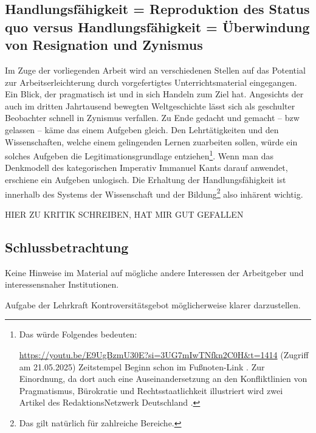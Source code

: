 \subsection{Handlungsfähigkeit = Reproduktion des Status quo versus Handlungsfähigkeit = Überwindung von Resignation und Zynismus}
Im Zuge der vorliegenden Arbeit wird an verschiedenen Stellen auf das Potential zur Arbeitserleichterung durch vorgefertigtes Unterrichtsmaterial eingegangen. Ein Blick, der pragmatisch ist und in sich Handeln zum Ziel hat. Angesichts der auch im dritten Jahrtausend bewegten Weltgeschichte lässt sich als geschulter Beobachter schnell in Zynismus verfallen. Zu Ende gedacht und gemacht -- \gls{bzw} gelassen -- käme das einem Aufgeben gleich. Den Lehrtätigkeiten und den Wissenschaften, welche einem gelingenden Lernen zuarbeiten sollen, würde ein solches Aufgeben die Legitimationsgrundlage entziehen\footnote{
    Das würde Folgendes bedeuten: 

    \url{https://youtu.be/E9UgBzmU30E?si=3UG7mIwTNfkn2C0H&t=1414} (Zugriff am 21.05.2025) Zeitstempel Beginn schon im Fußnoten-Link \autocite[][Als Meme von $23\,^{\prime}34\,^{\prime\prime}$ bis $23\,^{\prime}50\,^{\prime\prime}$ schauen]{Wolle}. Zur Einordnung, da dort auch %
    eine Auseinandersetzung an den Konfliktlinien von Pragmatismus, Bürokratie und Rechtsstaatlichkeit illustriert wird zwei Artikel des RedaktionsNetzwerk Deutschland \autocites{Schwarzer.05.02.2021}{Schwarzer.08.02.2021}.
}. Wenn man das Denkmodell des kategorischen Imperativ Immanuel Kants darauf anwendet, erschiene ein Aufgeben unlogisch. Die Erhaltung der Handlungsfähigkeit ist innerhalb des Systems der Wissenschaft und der Bildung\footnote{
    Das gilt natürlich für zahlreiche Bereiche. 
} also inhärent wichtig. 

HIER ZU  KRITIK SCHREIBEN, HAT MIR GUT GEFALLEN
\autocite[]{Roler2016}







\subsection{Schlussbetrachtung}
Keine Hinweise im Material auf mögliche andere Interessen der Arbeitgeber und interessensnaher Institutionen.

Aufgabe der Lehrkraft Kontroversitätsgebot möglicherweise klarer darzustellen.

